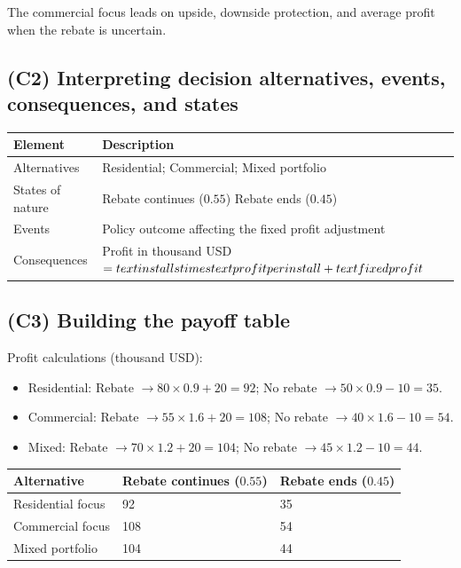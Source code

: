 \documentclass[11pt]{article}
\begin{document}
	
	The commercial focus leads on upside, downside protection, and average profit when the rebate is uncertain.
	
	\subsection*{(C2) Interpreting decision alternatives, events, consequences, and states}
	
	\hypertarget{problem9-c2}{}
	
	\begin{center}
		\begin{tabular}{ll}
			\toprule
			Element & Description \\
			\midrule
			Alternatives & Residential; Commercial; Mixed portfolio \\
			States of nature & Rebate continues
			($0.55$)
			Rebate ends
			($0.45$) \\
			Events & Policy outcome affecting the fixed profit adjustment \\
			Consequences & Profit in thousand USD $= \\text{installs} \\times \\text{profit per install} + \\text{fixed profit}$ \\
			\bottomrule
		\end{tabular}
	\end{center}
	
	\subsection*{(C3) Building the payoff table}
	
	\hypertarget{problem9-c3}{}
	
	Profit calculations (thousand USD):
	\begin{itemize}
		\item Residential: Rebate $\to 80 \times 0.9 + 20 = 92$; No rebate $\to 50 \times 0.9 - 10 = 35$.
		\item Commercial: Rebate $\to 55 \times 1.6 + 20 = 108$; No rebate $\to 40 \times 1.6 - 10 = 54$.
		\item Mixed: Rebate $\to 70 \times 1.2 + 20 = 104$; No rebate $\to 45 \times 1.2 - 10 = 44$.
	\end{itemize}
	\begin{center}
		\begin{tabular}{lll}
			\toprule
			Alternative & Rebate continues
			($0.55$) & Rebate ends
			($0.45$) \\
			\midrule
			Residential focus & 92 & 35 \\
			Commercial focus & 108 & 54 \\
			Mixed portfolio & 104 & 44 \\
			\bottomrule
		\end{tabular}
	\end{center}
	
\end{document}
